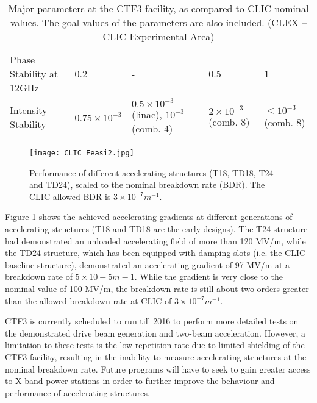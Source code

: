 \begin{table}[!htb]
{\begin{tabularx}{1.3\textwidth}{X | X | X | X | X}
    Phase Stability at 12GHz      & 0.2                   & -                                                 & 0.5                                        & 1                        \\
    Intensity Stability           & $0.75 \times 10^{-3}$ & $0.5 \times 10^{-3}$ (linac), $10^{-3}$ (comb. 4) & $2 \times 10^{-3}$ (comb. 8)               & $\leq 10^{-3}$ (comb. 8) \\
    \end{tabularx}
    }
\caption{Major parameters at the CTF3 facility, as compared to CLIC nominal values. The goal values of the parameters are also included. (CLEX – CLIC Experimental Area) \cite{CLIC:Concept}}
\label{tab:CLIC:Feasi1}
\end{table}

\begin{figure}[!htb]
    \centering
    \texttt{[image: CLIC\_Feasi2.jpg]}
    
    \caption{Performance of different accelerating structures (T18, TD18, T24 and TD24), scaled to the nominal breakdown rate (BDR). The CLIC allowed BDR is $3 \times 10^{-7} m^{-1}$. \cite{ICFA:BeamDynPress}}
    \label{fig:CLIC:Feasi2}
\end{figure} %

Figure \ref{fig:CLIC:Feasi2} shows the achieved accelerating gradients at different generations of accelerating structures (T18 and TD18 are the early designs). The T24 structure had demonstrated an unloaded accelerating field of more than 120 MV/m, while the TD24 structure, which has been equipped with damping slots (i.e. the CLIC baseline structure), demonstrated an accelerating gradient of 97 MV/m at a breakdown rate of $5 \times 10-5 m-1$. While the gradient is very close to the nominal value of 100 MV/m, the breakdown rate is still about two orders greater than the allowed breakdown rate at CLIC of $3 \times 10^{-7} m^{-1}$.

CTF3 is currently scheduled to run till 2016 \cite{ICFA:BeamDynPress} to perform more detailed tests on the demonstrated drive beam generation and two-beam acceleration. However, a limitation to these tests is the low repetition rate due to limited shielding of the CTF3 facility, resulting in the inability to measure accelerating structures at the nominal breakdown rate. Future programs will have to seek to gain greater access to X-band power stations in order to further improve the behaviour and performance of accelerating structures.

